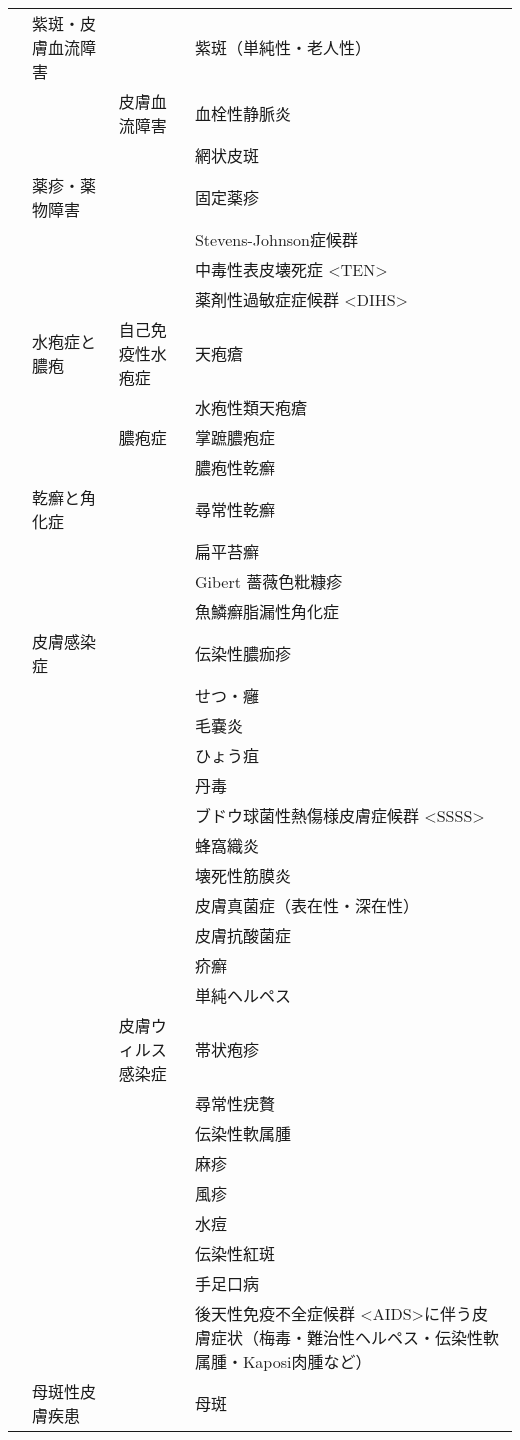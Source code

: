 \begin{xltabular}{\linewidth}{XXXX}
 & 紫斑・皮膚血流障害 &  & 紫斑（単純性・老人性） \\
 &  & 皮膚血流障害 & 血栓性静脈炎 \\
 &  &  & 網状皮斑 \\
 & 薬疹・薬物障害 &  & 固定薬疹 \\
 &  &  & Stevens-Johnson症候群 \\
 &  &  & 中毒性表皮壊死症 <TEN> \\
 &  &  & 薬剤性過敏症症候群 <DIHS> \\
 & 水疱症と膿疱 & 自己免疫性水疱症 & 天疱瘡 \\
 &  &  & 水疱性類天疱瘡 \\
 &  & 膿疱症 & 掌蹠膿疱症 \\
 &  &  & 膿疱性乾癬 \\
 & 乾癬と角化症 &  & 尋常性乾癬 \\
 &  &  & 扁平苔癬 \\
 &  &  & Gibert 薔薇色粃糠疹 \\
 &  &  & 魚鱗癬脂漏性角化症 \\
 & 皮膚感染症 &  & 伝染性膿痂疹 \\
 &  &  & せつ・癰 \\
 &  &  & 毛嚢炎 \\
 &  &  & ひょう疽 \\
 &  &  & 丹毒 \\
 &  &  & ブドウ球菌性熱傷様皮膚症候群 <SSSS> \\
 &  &  & 蜂窩織炎 \\
 &  &  & 壊死性筋膜炎 \\
 &  &  & 皮膚真菌症（表在性・深在性） \\
 &  &  & 皮膚抗酸菌症 \\
 &  &  & 疥癬 \\
 &  &  & 単純ヘルペス \\
 &  & 皮膚ウィルス感染症 & 帯状疱疹 \\
 &  &  & 尋常性疣贅 \\
 &  &  & 伝染性軟属腫 \\
 &  &  & 麻疹 \\
 &  &  & 風疹 \\
 &  &  & 水痘 \\
 &  &  & 伝染性紅斑 \\
 &  &  & 手足口病 \\
 &  &  & 後天性免疫不全症候群 <AIDS>に伴う皮膚症状（梅毒・難治性ヘルペス・伝染性軟属腫・Kaposi肉腫など） \\
 & 母斑性皮膚疾患 &  & 母斑 \\

\end{xltabular}

